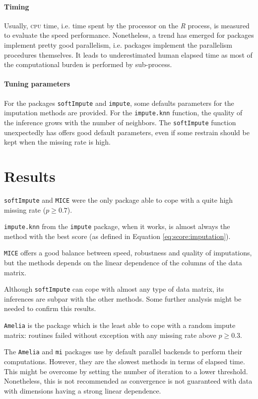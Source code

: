 \paragraph{Timing}
Usually, \textsc{cpu} time, i.e. time spent by the processor on the \emph{R}
process, is measured to evaluate the speed performance. Nonetheless, a trend
has emerged for packages implement pretty good parallelism, i.e. packages
implement the parallelism procedures themselves. It leads to underestimated
human elapsed time as most of the computational burden is performed by
sub-process.

\paragraph{Tuning parameters}
For the packages \texttt{softImpute} and \texttt{impute}, some defaults
parameters for the imputation methods are provided. For the \texttt{impute.knn}
function, the quality of the inference grows with the number of neighbors. The
\texttt{softImpute} function unexpectedly has offers good default parameters,
even if some restrain should be kept when the missing rate is high.

\section{Results}
\texttt{softImpute} and \texttt{MICE} were the only package able to cope with a
quite high missing rate ($p \geq 0.7$).

\texttt{impute.knn} from the \texttt{impute} package, when it works, is almost
always the method with the best score (as defined in
Equation \eqref{eq:score:imputation}).

\texttt{MICE} offers a good balance between speed, robustness and quality of
imputations, but the methods depends on the linear dependence of the columns of
the data matrix.

Although \texttt{softImpute} can cope with almost any type of data matrix, its
inferences are subpar with the other methods. Some further analysis might be
needed to confirm this results.

\texttt{Amelia} is the package which is the least able to cope with a random
impute matrix: routines failed without exception with any missing rate above
$p \geq 0.3$.

The \texttt{Amelia} and \texttt{mi} packages use by default parallel backends
to perform their computations. However, they are the slowest methods in terms
of elapsed time. This might be overcome by setting the number of iteration to a
lower threshold. Nonetheless, this is not recommended as convergence is not
guaranteed with data with dimensions having a strong linear dependence.

